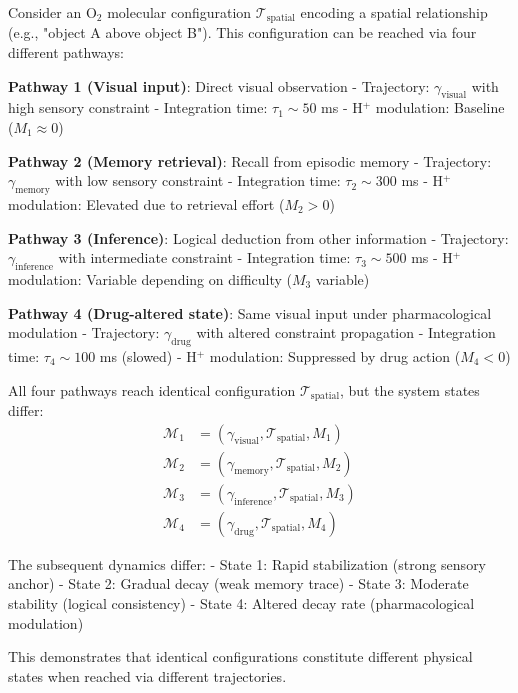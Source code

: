 \documentclass[aps,prd,twocolumn,superscriptaddress,floatfix,nofootinbib]{revtex4-2}
\theoremstyle{remark}
\begin{document}
\begin{example}
\label{ex:context_dependent}
Consider an O$_2$ molecular configuration $\mathcal{T}_{\text{spatial}}$ encoding a spatial relationship (e.g., "object A above object B"). This configuration can be reached via four different pathways:

\textbf{Pathway 1 (Visual input)}: Direct visual observation
- Trajectory: $\gamma_{\text{visual}}$ with high sensory constraint
- Integration time: $\tau_1 \sim 50$ ms
- H$^+$ modulation: Baseline ($M_1 \approx 0$)

\textbf{Pathway 2 (Memory retrieval)}: Recall from episodic memory
- Trajectory: $\gamma_{\text{memory}}$ with low sensory constraint
- Integration time: $\tau_2 \sim 300$ ms
- H$^+$ modulation: Elevated due to retrieval effort ($M_2 > 0$)

\textbf{Pathway 3 (Inference)}: Logical deduction from other information
- Trajectory: $\gamma_{\text{inference}}$ with intermediate constraint
- Integration time: $\tau_3 \sim 500$ ms
- H$^+$ modulation: Variable depending on difficulty ($M_3$ variable)

\textbf{Pathway 4 (Drug-altered state)}: Same visual input under pharmacological modulation
- Trajectory: $\gamma_{\text{drug}}$ with altered constraint propagation
- Integration time: $\tau_4 \sim 100$ ms (slowed)
- H$^+$ modulation: Suppressed by drug action ($M_4 < 0$)

All four pathways reach identical configuration $\mathcal{T}_{\text{spatial}}$, but the system states differ:
\begin{align}
\mathcal{M}_1 &= (\gamma_{\text{visual}}, \mathcal{T}_{\text{spatial}}, M_1) \\
\mathcal{M}_2 &= (\gamma_{\text{memory}}, \mathcal{T}_{\text{spatial}}, M_2) \\
\mathcal{M}_3 &= (\gamma_{\text{inference}}, \mathcal{T}_{\text{spatial}}, M_3) \\
\mathcal{M}_4 &= (\gamma_{\text{drug}}, \mathcal{T}_{\text{spatial}}, M_4)
\end{align}

The subsequent dynamics differ:
- State 1: Rapid stabilization (strong sensory anchor)
- State 2: Gradual decay (weak memory trace)
- State 3: Moderate stability (logical consistency)
- State 4: Altered decay rate (pharmacological modulation)

This demonstrates that identical configurations constitute different physical states when reached via different trajectories.
\end{example}
\end{document}
